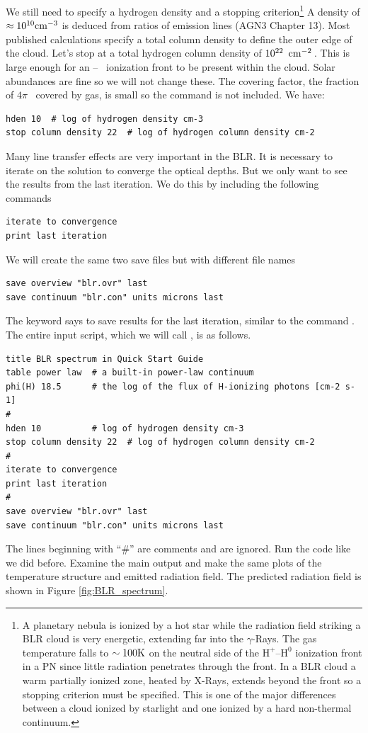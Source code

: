 \documentclass[12pt,twoside]{article}
\begin{document}
{We still need to specify a hydrogen density and a stopping
criterion\footnote{A planetary nebula is ionized by a hot star while the radiation
field striking a BLR cloud is very energetic, extending far into the $\gamma$-Rays.
The gas temperature falls to $\sim 100 \rm{K}$
on the neutral side of the $\mathrm{H}^+$--$\mathrm{H}^0$
ionization front in a PN since little radiation penetrates through the front.
In a BLR cloud a warm partially ionized zone, heated by X-Rays, extends
beyond the front so a stopping criterion must be specified.  This is one
of the major differences between a cloud ionized by starlight and one ionized
by a hard non-thermal continuum.}
A density of $\approx 10^{10} \rm{cm^{-3}}$ is
deduced from ratios of emission lines (AGN3
Chapter 13).
Most published calculations specify a total column density
to define the outer edge of the cloud.
Let's stop at a total hydrogen column density
of $10^{22}\ \mbox{${\rm\thinspace cm}^{-2}\,$}$.
This is large enough for an \hplus -- \hO\
ionization front to be present within the cloud.
Solar abundances are fine so we will not change these.
The covering factor, the fraction of $4\pi$ \sr\ covered by gas, is
small so the \cdCommand{sphere} command is not included.  We have:
\small
\begin{verbatim}
hden 10  # log of hydrogen density cm-3
stop column density 22  # log of hydrogen column density cm-2
\end{verbatim}
\normalsize
Many line transfer effects are very important in the BLR.  It is necessary
to iterate on the solution to converge the optical depths.  
But we only want to see the results from the last iteration.
We do this by
including the following commands
\small
\begin{verbatim}
iterate to convergence
print last iteration
\end{verbatim}
\normalsize
We will create the same two save files but with different file names
\small
\begin{verbatim}
save overview "blr.ovr" last
save continuum "blr.con" units microns last
\end{verbatim}
\normalsize
The keyword  says to save results
for the last iteration, 
similar to the command .
The entire
input script, which we will call , is as follows.
\small
\begin{verbatim}
title BLR spectrum in Quick Start Guide
table power law  # a built-in power-law continuum
phi(H) 18.5      # the log of the flux of H-ionizing photons [cm-2 s-1]
#
hden 10          # log of hydrogen density cm-3
stop column density 22  # log of hydrogen column density cm-2
#
iterate to convergence
print last iteration
#
save overview "blr.ovr" last
save continuum "blr.con" units microns last
\end{verbatim}
\normalsize
The lines beginning with ``\#'' are comments and are ignored.
Run the code like we did before.
Examine the main output  and make
the same plots of the temperature structure and emitted radiation field.
The predicted radiation field is shown in Figure \ref{fig:BLR_spectrum}.

}
\end{document}
